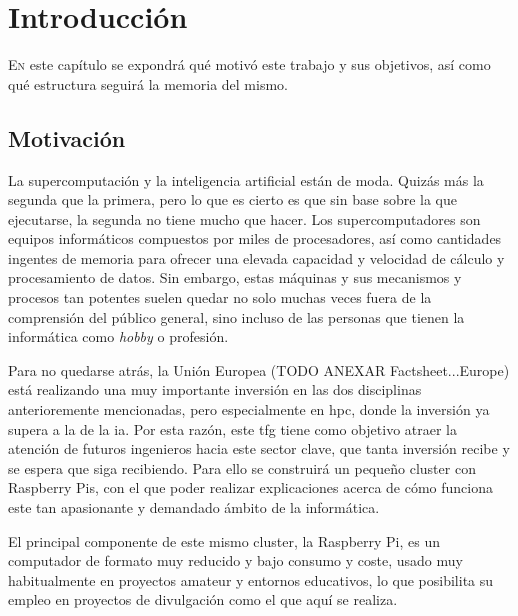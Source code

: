 \chapter{Introducción}
\label{chap:introducion}

\lettrine{E}{n} este capítulo se expondrá qué motivó este trabajo y sus objetivos, así como qué estructura seguirá la memoria del mismo.


\section{Motivación}
\label{sec:motivacion}

La supercomputación y la inteligencia artificial están de moda. Quizás más la segunda que la primera, pero lo que es cierto es que sin base sobre la que ejecutarse, la segunda no tiene mucho que hacer.
Los supercomputadores son equipos informáticos compuestos por miles de procesadores, así como cantidades ingentes de memoria para ofrecer una elevada capacidad y velocidad de cálculo y procesamiento de datos.
Sin embargo, estas máquinas y sus mecanismos y procesos tan potentes suelen quedar no solo muchas veces fuera de la comprensión del público general, sino incluso de las personas que tienen la informática como \textit{hobby} o profesión.

Para no quedarse atrás, la Unión Europea (TODO ANEXAR Factsheet...Europe) está realizando una muy importante inversión en las dos disciplinas anterioremente mencionadas, pero especialmente en \acrshort{hpc}, donde la inversión ya supera a la de la \acrshort{ia}.
Por esta razón, este \acrshort{tfg} tiene como objetivo atraer la atención de futuros ingenieros hacia este sector clave, que tanta inversión recibe y se espera que siga recibiendo. Para ello se construirá un pequeño cluster con Raspberry Pis, con el que poder realizar explicaciones acerca de cómo funciona este tan apasionante y demandado ámbito de la informática.

El principal componente de este mismo cluster, la Raspberry Pi, es un computador de formato muy reducido y bajo consumo y coste, usado muy habitualmente en proyectos amateur y entornos educativos, lo que posibilita su empleo en proyectos de divulgación como el que aquí se realiza.


